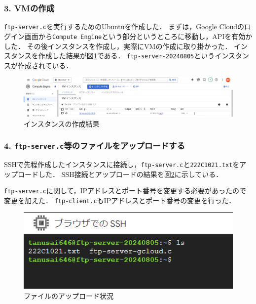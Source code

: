 \documentclass[documentclass]{jsarticle}
\begin{document}
\subsubsection*{3. VMの作成}
\texttt{ftp-server.c}を実行するためのUbuntuを作成した．
まずは，Google Cloudのログイン画面から\texttt{Compute Engine}という部分というところに移動し，APIを有効かした．
その後インスタンスを作成し，実際にVMの作成に取り掛かった．
インスタンスを作成した結果が図\ref*{fig:4-2}である．
\texttt{ftp-server-20240805}というインスタンスが作成されている．

\begin{figure}[H]
  \begin{center}
    \includegraphics*[scale=0.35]{figure/4-2.png}
  \end{center}
  \caption{インスタンスの作成結果}
  \label{fig:4-2}
\end{figure}


\subsubsection*{4. \texttt{ftp-server.c}等のファイルをアップロードする}
SSHで先程作成したインスタンスに接続し，\texttt{ftp-server.c}と\texttt{222C1021.txt}をアップロードした．
SSH接続とアップロードの結果を図\ref*{fig:4-3}に示している．

\texttt{ftp-server.c}に関して，IPアドレスとポート番号を変更する必要があったので変更を加えた．
\texttt{ftp-client.c}もIPアドレスとポート番号の変更を行った．

\begin{figure}[H]
  \begin{center}
    \includegraphics*[scale=0.8]{figure/4-3.png}
  \end{center}
  \caption{ファイルのアップロード状況}
  \label{fig:4-3}
\end{figure}
\end{document}
